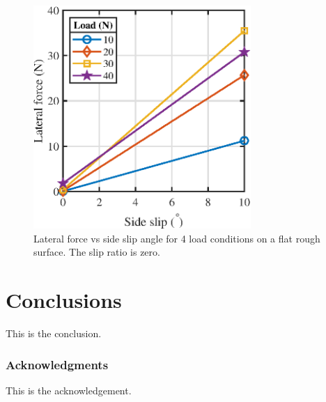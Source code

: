 \documentclass{article}
\begin{document}
\begin{figure}[hbt!]
\centering
\includegraphics[width=3.25in]{plots/lateral-force-vs-side-slip.eps}
\caption{Lateral force vs side slip angle for 4 load conditions on a flat rough surface. The slip ratio is zero.}
\label{fig:lateral-force-vs-side-slip}
\end{figure}



\section{Conclusions}

This is the conclusion.

\subsubsection*{Acknowledgments}
This is the acknowledgement.




\end{document}
